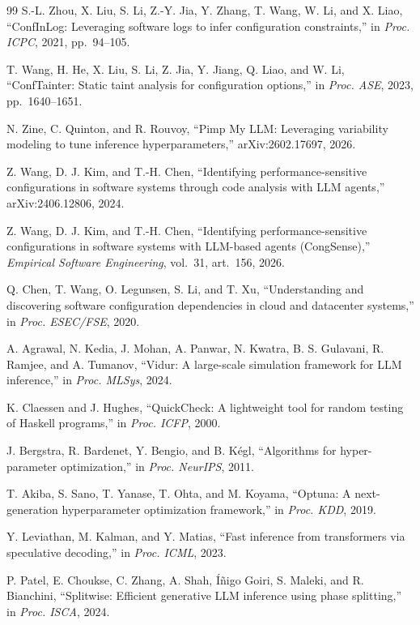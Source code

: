 \documentclass[journal]{IEEEtran}
\begin{document}
\begin{thebibliography}{99}
 S.-L. Zhou, X. Liu, S. Li, Z.-Y. Jia, Y. Zhang, T. Wang, W. Li, and X. Liao, ``ConfInLog: Leveraging software logs to infer configuration constraints,'' in \emph{Proc. ICPC}, 2021, pp.~94--105.

 T. Wang, H. He, X. Liu, S. Li, Z. Jia, Y. Jiang, Q. Liao, and W. Li, ``ConfTainter: Static taint analysis for configuration options,'' in \emph{Proc. ASE}, 2023, pp.~1640--1651.

 N. Zine, C. Quinton, and R. Rouvoy, ``Pimp My LLM: Leveraging variability modeling to tune inference hyperparameters,'' arXiv:2602.17697, 2026.

 Z. Wang, D. J. Kim, and T.-H. Chen, ``Identifying performance-sensitive configurations in software systems through code analysis with LLM agents,'' arXiv:2406.12806, 2024.

 Z. Wang, D. J. Kim, and T.-H. Chen, ``Identifying performance-sensitive configurations in software systems with LLM-based agents (CongSense),'' \emph{Empirical Software Engineering}, vol.~31, art.~156, 2026.

 Q. Chen, T. Wang, O. Legunsen, S. Li, and T. Xu, ``Understanding and discovering software configuration dependencies in cloud and datacenter systems,'' in \emph{Proc. ESEC/FSE}, 2020.

 A. Agrawal, N. Kedia, J. Mohan, A. Panwar, N. Kwatra, B. S. Gulavani, R. Ramjee, and A. Tumanov, ``Vidur: A large-scale simulation framework for LLM inference,'' in \emph{Proc. MLSys}, 2024.

 K. Claessen and J. Hughes, ``QuickCheck: A lightweight tool for random testing of Haskell programs,'' in \emph{Proc. ICFP}, 2000.

 J. Bergstra, R. Bardenet, Y. Bengio, and B. K\'egl, ``Algorithms for hyper-parameter optimization,'' in \emph{Proc. NeurIPS}, 2011.

 T. Akiba, S. Sano, T. Yanase, T. Ohta, and M. Koyama, ``Optuna: A next-generation hyperparameter optimization framework,'' in \emph{Proc. KDD}, 2019.

 Y. Leviathan, M. Kalman, and Y. Matias, ``Fast inference from transformers via speculative decoding,'' in \emph{Proc. ICML}, 2023.

 P. Patel, E. Choukse, C. Zhang, A. Shah, \'I\~nigo Goiri, S. Maleki, and R. Bianchini, ``Splitwise: Efficient generative LLM inference using phase splitting,'' in \emph{Proc. ISCA}, 2024.


\end{thebibliography}
\end{document}
